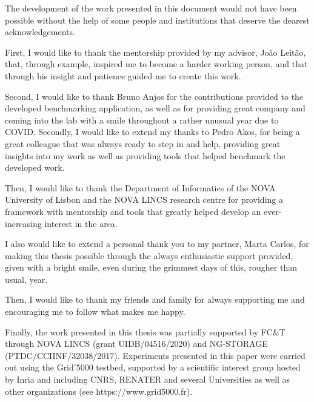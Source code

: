 

\begin{ntacknowledgements}


The development of the work presented in this document would not have been possible without the help of some people and institutions that deserve the dearest acknowledgements.

First, I would like to thank the mentorship provided by my advisor, João Leitão, that, through example, inspired me to become a harder working person, and that through his insight and patience guided me to create this work.

Second, I would like to thank Bruno Anjos for the contributions provided to the developed benchmarking application, as well as for providing great company and coming into the lab with a smile throughout a rather unusual year due to COVID. Secondly, I would like to extend my thanks to Pedro Akos, for being a great colleague that was always ready to step in and help, providing great insights into my work as well as providing tools that helped benchmark the developed work.

Then, I would like to thank the Department of Informatics of the NOVA University of Lisbon and the NOVA LINCS research centre for providing a framework with mentorship and tools that greatly helped develop an ever-increasing interest in the area.

I also would like to extend a personal thank you to my partner, Marta Carlos, for making this thesis possible through the always enthusiastic support provided, given with a bright smile, even during the grimmest days of this, rougher than usual, year.

Then, I would like to thank my friends and family for always supporting me and encouraging me to follow what makes me happy.

Finally, the work presented in this thesis was partially supported by FC&T through NOVA LINCS (grant UIDB/04516/2020) and NG-STORAGE (PTDC/CCIINF/32038/2017). Experiments presented in this paper were carried out using the Grid’5000 testbed, supported by a scientific interest group hosted by Inria and including CNRS, RENATER and several Universities as well as other organizations (see https://www.grid5000.fr).



\end{ntacknowledgements}